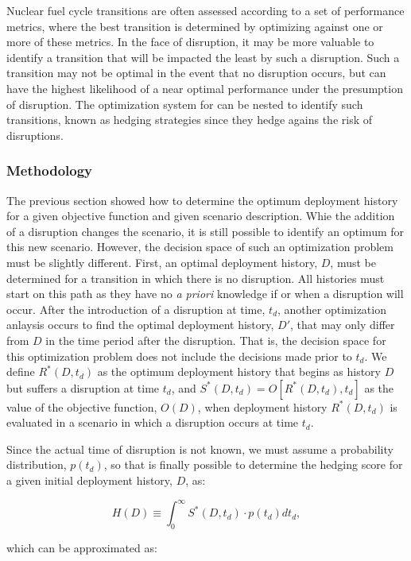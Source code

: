 Nuclear fuel cycle transitions are often assessed according to a set of
performance metrics, where the best transition is determined by optimizing
against one or more of these metrics.  In the face of disruption, it may be
more valuable to identify a transition that will be impacted the least by such
a disruption.  Such a transition may not be optimal in the event that no
disruption occurs, but can have the highest likelihood of a near optimal
performance under the presumption of disruption.  The optimization system for
\Cyclus{} can be nested to identify such transitions, known as hedging
strategies since they hedge agains the risk of disruptions.

\subsubsection{Methodology}

The previous section showed how to determine the optimum deployment history
for a given objective function and given scenario description.  Whie the
addition of a disruption changes the scenario, it is still possible to
identify an optimum for this new scenario.  However, the decision space of
such an optimization problem must be slightly different.  First, an optimal
deployment history, $D$, must be determined for a transition in which there is
no disruption.  All histories must start on this path as they have no
\textit{a priori} knowledge if or when a disruption will occur.  After the
introduction of a disruption at time, $t_d$, another optimization anlaysis
occurs to find the optimal deployment history, $D'$, that may only differ from
$D$ in the time period after the disruption.  That is, the decision space for
this optimization problem does not include the decisions made prior to $t_d$.
We define $R^*(D,t_d)$ as the optimum deployment history that begins as
history $D$ but suffers a disruption at time $t_d$, and $S^*(D,t_d) =
O[R^*(D,t_d),t_d]$ as the value of the objective function, $O(D)$, when
deployment history $R^*(D,t_d)$ is evaluated in a scenario in which a
disruption occurs at time $t_d$.

Since the actual time of disruption is not known, we must assume a probability
distribution, $p(t_d)$, so that is finally possible to determine the hedging
score for a given initial deployment history, $D$, as:

$$H(D) \equiv \int_0^\infty S^*(D,t_d) \cdot p(t_d) dt_d,$$

\noindent which can be approximated as:

